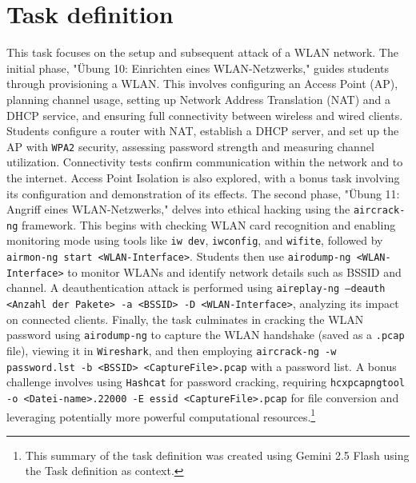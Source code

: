 \documentclass[a4paper]{article}
\begin{document}
\section{Task definition}
This task focuses on the setup and subsequent attack of a WLAN network. The initial phase, "Übung 10: Einrichten eines WLAN-Netzwerks," guides students through provisioning a WLAN. This involves configuring an Access Point (AP), planning channel usage, setting up Network Address Translation (NAT) and a DHCP service, and ensuring full connectivity between wireless and wired clients. Students configure a router with NAT, establish a DHCP server, and set up the AP with \texttt{WPA2} security, assessing password strength and measuring channel utilization. Connectivity tests confirm communication within the network and to the internet. Access Point Isolation is also explored, with a bonus task involving its configuration and demonstration of its effects. \nl
The second phase, "Übung 11: Angriff eines WLAN-Netzwerks," delves into ethical hacking using the \texttt{aircrack-ng} framework. This begins with checking WLAN card recognition and enabling monitoring mode using tools like \texttt{iw dev}, \texttt{iwconfig}, and \texttt{wifite}, followed by \texttt{airmon-ng start <WLAN-Interface>}. Students then use \texttt{airodump-ng <WLAN-Interface>} to monitor WLANs and identify network details such as BSSID and channel. A deauthentication attack is performed using \texttt{aireplay-ng --deauth <Anzahl der Pakete> -a <BSSID> -D <WLAN-Interface>}, analyzing its impact on connected clients. Finally, the task culminates in cracking the WLAN password using \texttt{airodump-ng} to capture the WLAN handshake (saved as a \texttt{.pcap} file), viewing it in \texttt{Wireshark}, and then employing \texttt{aircrack-ng -w password.lst -b <BSSID> <CaptureFile>.pcap} with a password list. A bonus challenge involves using \texttt{Hashcat} for password cracking, requiring \texttt{hcxpcapngtool -o <Datei-name>.22000 -E essid <CaptureFile>.pcap} for file conversion and leveraging potentially more powerful computational resources.\footnote{This summary of the task definition was created using Gemini 2.5 Flash using the Task definition as context.}
\end{document}
